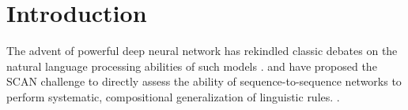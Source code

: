 \section{Introduction}
The advent of powerful deep neural network has rekindled classic
debates on the natural language processing abilities of such models
\cite[e.g.,][]{Kirov:Cotterell:2018,Linzen:etal:2018,McCoy:etal:2018,Pater:2018}. \citet{Lake:Baroni:2017}
and \citet{Loula:etal:2018} have proposed the SCAN challenge to
directly assess the ability of sequence-to-sequence networks to
perform systematic, compositional generalization of linguistic rules.
\cite{Bastings:etal:2018}.



